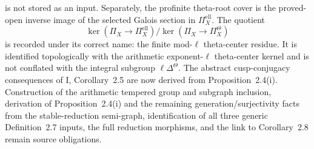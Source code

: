 \begin{definition}
  is not stored as an input.  Separately, the
  profinite theta-root cover is the proved-open inverse image of the selected
  Galois section in \(\Pi_X^{\mathrm{ell}}\).  The quotient
  \[
    \ker(\Pi_X\to\Pi_X^{\mathrm{ell}})/
    \ker(\Pi_X\to\Pi_X^\Theta)
  \]
  is recorded under its correct name: the finite mod-\(\ell\) theta-center
  residue.  It is identified topologically with the arithmetic exponent-\(\ell\)
  theta-center kernel and is not conflated with the integral subgroup
  \(\ell\Delta^\Theta\).  The abstract cusp-conjugacy consequences of
  \IUT{} I, Corollary~2.5 are now derived from Proposition~2.4(i).  Construction
  of the arithmetic tempered group and subgraph inclusion, derivation of
  Proposition~2.4(i) and the remaining generation/surjectivity facts from the
  stable-reduction semi-graph, identification of all three generic
  Definition~2.7 inputs, the full reduction morphisms, and the link to
  Corollary~2.8 remain source obligations.
\end{definition}


